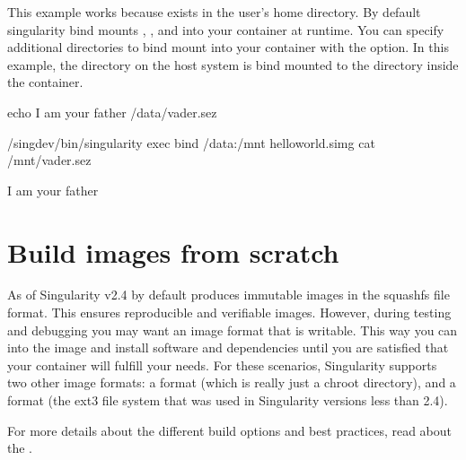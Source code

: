 \documentclass[letterpaper,10pt,english]{sphinxmanual}
\begin{document}
This example works because  exists in the user’s home directory. By
default singularity bind mounts , , and  into your container at
runtime.
You can specify additional directories to bind mount into your
container with the {\hyperref[\detokenize{bind_paths_and_mounts:bind-paths-and-mounts}]{}} option. In this example, the  directory on the host
system is bind mounted to the  directory inside the container.

%
\begin{sphinxVerbatim}[commandchars=\\\{\}]
\PYGZdl{} echo \PYGZdq{}I am your father\PYGZdq{} \PYGZgt{}/data/vader.sez

\PYGZdl{} \PYGZti{}/sing\PYGZhy{}dev/bin/singularity exec \PYGZhy{}\PYGZhy{}bind /data:/mnt hello\PYGZhy{}world.simg cat /mnt/vader.sez

I am your father
\end{sphinxVerbatim}


\section{Build images from scratch}
\label{\detokenize{quick_start:build-images-from-scratch}}\label{\detokenize{quick_start:id2}}\label{\detokenize{quick_start:sec-buildimagesfromscratch}}
As of Singularity v2.4 by default  produces immutable images in the
squashfs file format. This ensures reproducible and verifiable images.
However, during testing and debugging you may want an image format
that is writable. This way you can  into the image and install software
and dependencies until you are satisfied that your container will
fulfill your needs. For these scenarios, Singularity supports two
other image formats: a  format (which is really just a chroot
directory), and a  format (the ext3 file system that was used in
Singularity versions less than 2.4).

For more details about the different build options and best practices,
read about the {\hyperref[\detokenize{singularity_flow:singularity-flow}]{}}.
\end{document}
